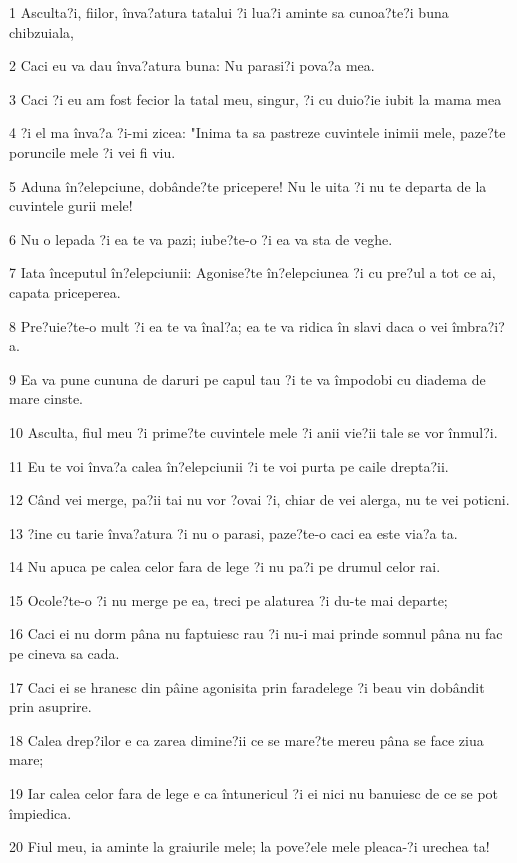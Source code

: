 \par 1 Asculta?i, fiilor, înva?atura tatalui ?i lua?i aminte sa cunoa?te?i buna chibzuiala,
\par 2 Caci eu va dau înva?atura buna: Nu parasi?i pova?a mea.
\par 3 Caci ?i eu am fost fecior la tatal meu, singur, ?i cu duio?ie iubit la mama mea
\par 4 ?i el ma înva?a ?i-mi zicea: "Inima ta sa pastreze cuvintele inimii mele, paze?te poruncile mele ?i vei fi viu.
\par 5 Aduna în?elepciune, dobânde?te pricepere! Nu le uita ?i nu te departa de la cuvintele gurii mele!
\par 6 Nu o lepada ?i ea te va pazi; iube?te-o ?i ea va sta de veghe.
\par 7 Iata începutul în?elepciunii: Agonise?te în?elepciunea ?i cu pre?ul a tot ce ai, capata priceperea.
\par 8 Pre?uie?te-o mult ?i ea te va înal?a; ea te va ridica în slavi daca o vei îmbra?i?a.
\par 9 Ea va pune cununa de daruri pe capul tau ?i te va împodobi cu diadema de mare cinste.
\par 10 Asculta, fiul meu ?i prime?te cuvintele mele ?i anii vie?ii tale se vor înmul?i.
\par 11 Eu te voi înva?a calea în?elepciunii ?i te voi purta pe caile drepta?ii.
\par 12 Când vei merge, pa?ii tai nu vor ?ovai ?i, chiar de vei alerga, nu te vei poticni.
\par 13 ?ine cu tarie înva?atura ?i nu o parasi, paze?te-o caci ea este via?a ta.
\par 14 Nu apuca pe calea celor fara de lege ?i nu pa?i pe drumul celor rai.
\par 15 Ocole?te-o ?i nu merge pe ea, treci pe alaturea ?i du-te mai departe;
\par 16 Caci ei nu dorm pâna nu faptuiesc rau ?i nu-i mai prinde somnul pâna nu fac pe cineva sa cada.
\par 17 Caci ei se hranesc din pâine agonisita prin faradelege ?i beau vin dobândit prin asuprire.
\par 18 Calea drep?ilor e ca zarea dimine?ii ce se mare?te mereu pâna se face ziua mare;
\par 19 Iar calea celor fara de lege e ca întunericul ?i ei nici nu banuiesc de ce se pot împiedica.
\par 20 Fiul meu, ia aminte la graiurile mele; la pove?ele mele pleaca-?i urechea ta!
